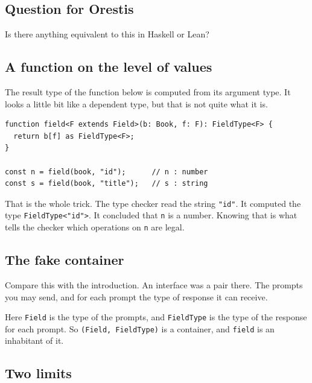 \documentclass[11pt,a4paper]{article}
\begin{document}
\begin{pinkbox}
\begin{orestisbox}
\subsection{Question for Orestis}

Is there anything equivalent to this in Haskell or Lean?
\end{orestisbox}

\newpage

\subsection{A function on the level of values}

The result type of the function below is computed from its argument type. It looks a little bit
like a dependent type, but that is not quite what it is.

\begin{lstlisting}[language=TS]
function field<F extends Field>(b: Book, f: F): FieldType<F> {
  return b[f] as FieldType<F>;
}

const n = field(book, "id");      // n : number
const s = field(book, "title");   // s : string
\end{lstlisting}

That is the whole trick. The type checker read the string \texttt{"id"}. It computed the type
\texttt{FieldType<"id">}. It concluded that \texttt{n} is a number. Knowing that is what tells the
checker which operations on \texttt{n} are legal.

\subsection{The fake container}

Compare this with the introduction. An interface was a pair there. The prompts you may send, and
for each prompt the type of response it can receive.

Here \texttt{Field} is the type of the prompts, and \texttt{FieldType} is the type of the response
for each prompt. So \texttt{(Field, FieldType)} is a container, and \texttt{field} is an inhabitant
of it.

\subsection{Two limits}

\begin{orestisbox}
\begin{itemize}\setlength{\itemsep}{4pt}


\end{itemize}
\end{orestisbox}
\end{pinkbox}
\end{document}
